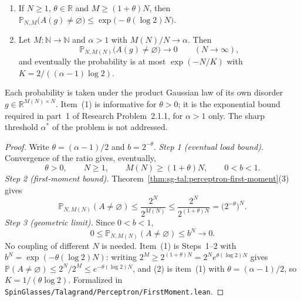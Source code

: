 \begin{theorem}\label{thm:sg-tal:perceptron-empty}
  \leanok
{}
\begin{enumerate}
\item If $N\ge1$, $\theta\in\mathbb R$ and $M\ge(1+\theta)N$, then
$\mathbb P_{N,M}\bigl(A(g)\ne\varnothing\bigr)\le\exp\bigl(-\theta(\log2)N\bigr)$.
\item Let $M:\mathbb N\to\mathbb N$ and $\alpha>1$ with $M(N)/N\to\alpha$. Then
\[
\mathbb P_{N,M(N)}\bigl(A(g)\ne\varnothing\bigr)\longrightarrow0\qquad(N\to\infty),
\]
and eventually the probability is at most $\exp(-N/K)$ with $K=2/((\alpha-1)\log2)$.
\end{enumerate}
Each probability is taken under the product Gaussian law of its own disorder $g\in\mathbb R^{M(N)\times N}$.
Item~(1) is informative for $\theta>0$; it is the exponential bound required in part~1 of Research Problem~2.1.1,
for $\alpha>1$ only. The sharp threshold $\alpha^*$ of the problem is not addressed.
\end{theorem}
\begin{proof}
  \leanok
Write $\theta=(\alpha-1)/2$ and $b=2^{-\theta}$.
\emph{Step 1 (eventual load bound).} Convergence of the ratio gives, eventually,
\[
 \theta>0,\qquad N\ge1,\qquad M(N)\ge(1+\theta)N,\qquad 0<b<1.
\]
\emph{Step 2 (first-moment bound).} Theorem~\ref{thm:sg-tal:perceptron-first-moment}(3) gives
\[
\mathbb P_{N,M(N)}(A\ne\varnothing)\le\frac{2^N}{2^{M(N)}}\le\frac{2^N}{2^{(1+\theta)N}}=\bigl(2^{-\theta}\bigr)^N.
\]
\emph{Step 3 (geometric limit).} Since $0<b<1$,
\[
 0\le\mathbb P_{N,M(N)}(A\ne\varnothing)\le b^N\longrightarrow0.
\]
No coupling of different $N$ is needed. Item~(1) is Steps~1--2 with $b^N=\exp(-\theta(\log2)N)$: writing
$2^{M}\ge2^{(1+\theta)N}=2^N e^{\theta(\log2)N}$ gives
$\mathbb P(A\ne\varnothing)\le2^N/2^M\le e^{-\theta(\log2)N}$, and (2) is item~(1) with
$\theta=(\alpha-1)/2$, so $K=1/(\theta\log2)$.
Formalized in \texttt{SpinGlasses/Talagrand/Perceptron/FirstMoment.lean}.
\end{proof}

